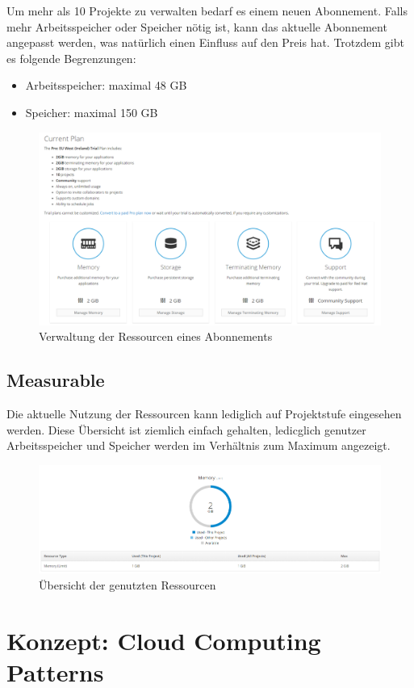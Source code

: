 \documentclass[12pt,a4paper]{article}
\begin{document}
Um mehr als 10 Projekte zu verwalten bedarf es einem neuen Abonnement. Falls mehr Arbeitsspeicher oder Speicher nötig ist, kann das aktuelle Abonnement angepasst werden, was natürlich einen Einfluss auf den Preis hat. Trotzdem gibt es folgende Begrenzungen:

\begin{itemize}
	\item Arbeitsspeicher: maximal 48 GB
	\item Speicher: maximal 150 GB
\end{itemize}

\begin{figure}[h]
	\centering
	\includegraphics[width=0.7\linewidth]{img/os-scalability}
	\caption{Verwaltung der Ressourcen eines Abonnements}
	\label{fig:os-scalability}
\end{figure}

\subsection{Measurable}

Die aktuelle Nutzung der Ressourcen kann lediglich auf Projektstufe eingesehen werden. Diese Übersicht ist ziemlich einfach gehalten, ledicglich genutzer Arbeitsspeicher und Speicher werden im Verhältnis zum Maximum angezeigt.

\begin{figure}[h]
	\centering
	\includegraphics[width=0.7\linewidth]{img/os-quota}
	\caption{Übersicht der genutzten Ressourcen}
	\label{fig:os-quota}
\end{figure}

\section{Konzept: Cloud Computing Patterns}
\end{document}
